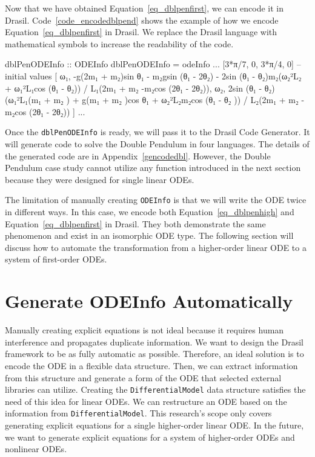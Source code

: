 Now that we have obtained Equation~\ref{eq_dblpenfirst}, we can encode it in Drasil. Code~\ref{code_encodedblpend} shows the example of how we encode Equation~\ref{eq_dblpenfirst} in Drasil. We replace the Drasil language with mathematical symbols to increase the readability of the code.
\begin{listing}[ht]
\begin{haskell1}
dblPenODEInfo :: ODEInfo
dblPenODEInfo = odeInfo
...
[3*π/7, 0, 3*π/4, 0] -- initial values
[ ω₁,
  -g(2m₁ + m₂)sin θ₁ - m₂gsin (θ₁ - 2θ₂) - 2sin (θ₁ - θ₂)m₂(ω₂²L₂ + ω₁²L₁cos (θ₁ - θ₂)) / L₁(2m₁ + m₂ -m₂cos (2θ₁ - 2θ₂)),
  ω₂,
  2sin (θ₁ - θ₂)(ω₁²L₁(m₁ + m₂ ) + g(m₁ + m₂ )cos θ₁ + ω₂²L₂m₂cos (θ₁ - θ₂ )) / L₂(2m₁ + m₂ -m₂cos (2θ₁ - 2θ₂))
]
...
\end{haskell1}
\label{code_encodedblpend}
\end{listing}

Once the \verb|dblPenODEInfo| is ready, we will pass it to the Drasil Code Generator. It will generate code to solve the Double Pendulum in four languages. The details of the generated code are in Appendix~\ref{gencodedbl}. However, the Double Pendulum case study cannot utilize any function introduced in the next section because they were designed for single linear ODEs.

The limitation of manually creating \verb|ODEInfo| is that we will write the ODE twice in different ways. In this case, we encode both Equation~\ref{eq_dblpenhigh} and Equation~\ref{eq_dblpenfirst} in Drasil. They both demonstrate the same phenomenon and exist in an isomorphic ODE type. The following section will discuss how to automate the transformation from a higher-order linear ODE to a system of first-order ODEs.

\section{Generate ODEInfo Automatically}
Manually creating explicit equations is not ideal because it requires human interference and propagates duplicate information. We want to design the Drasil framework to be as fully automatic as possible. Therefore, an ideal solution is to encode the ODE in a flexible data structure. Then, we can extract information from this structure and generate a form of the ODE that selected external libraries can utilize. Creating the \verb|DifferentialModel| data structure satisfies the need of this idea for linear ODEs. We can restructure an ODE based on the information from \verb|DifferentialModel|. This research's scope only covers generating explicit equations for a single higher-order linear ODE. In the future, we want to generate explicit equations for a system of higher-order ODEs and nonlinear ODEs.

